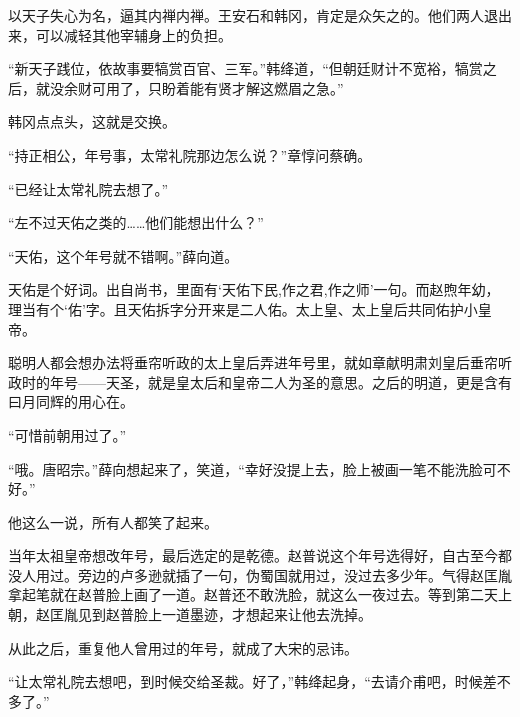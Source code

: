 以天子失心为名，逼其内禅内禅。王安石和韩冈，肯定是众矢之的。他们两人退出来，可以减轻其他宰辅身上的负担。

“新天子践位，依故事要犒赏百官、三军。”韩绛道，“但朝廷财计不宽裕，犒赏之后，就没余财可用了，只盼着能有贤才解这燃眉之急。”

韩冈点点头，这就是交换。

“持正相公，年号事，太常礼院那边怎么说？”章惇问蔡确。

“已经让太常礼院去想了。”

“左不过天佑之类的……他们能想出什么？”

“天佑，这个年号就不错啊。”薛向道。

天佑是个好词。出自尚书，里面有‘天佑下民,作之君,作之师’一句。而赵煦年幼，理当有个‘佑’字。且天佑拆字分开来是二人佑。太上皇、太上皇后共同佑护小皇帝。

聪明人都会想办法将垂帘听政的太上皇后弄进年号里，就如章献明肃刘皇后垂帘听政时的年号——天圣，就是皇太后和皇帝二人为圣的意思。之后的明道，更是含有曰月同辉的用心在。

“可惜前朝用过了。”

“哦。唐昭宗。”薛向想起来了，笑道，“幸好没提上去，脸上被画一笔不能洗脸可不好。”

他这么一说，所有人都笑了起来。

当年太祖皇帝想改年号，最后选定的是乾德。赵普说这个年号选得好，自古至今都没人用过。旁边的卢多逊就插了一句，伪蜀国就用过，没过去多少年。气得赵匡胤拿起笔就在赵普脸上画了一道。赵普还不敢洗脸，就这么一夜过去。等到第二天上朝，赵匡胤见到赵普脸上一道墨迹，才想起来让他去洗掉。

从此之后，重复他人曾用过的年号，就成了大宋的忌讳。

“让太常礼院去想吧，到时候交给圣裁。好了，”韩绛起身，“去请介甫吧，时候差不多了。”

